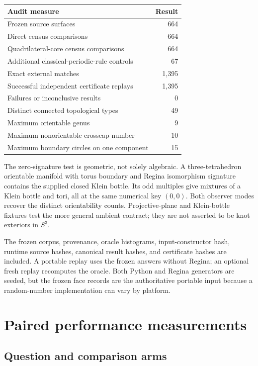 \begin{center}
\begin{tabular}{lr}
\toprule
Audit measure & Result\\
\midrule
Frozen source surfaces & 664\\
Direct census comparisons & 664\\
Quadrilateral-core census comparisons & 664\\
Additional classical-periodic-rule controls & 67\\
Exact external matches & 1,395\\
Successful independent certificate replays & 1,395\\
Failures or inconclusive results & 0\\
Distinct connected topological types & 49\\
Maximum orientable genus & 9\\
Maximum nonorientable crosscap number & 10\\
Maximum boundary circles on one component & 15\\
\bottomrule
\end{tabular}
\end{center}

The zero-signature test is geometric, not solely algebraic. A three-tetrahedron
orientable manifold with torus boundary and Regina isomorphism signature
 contains the supplied closed Klein bottle. Its odd
multiples give mixtures of a Klein bottle and tori, all at the same
numerical key $(0,0)$. Both observer modes recover the distinct
orientability counts. Projective-plane and Klein-bottle fixtures test
the more general ambient contract; they are not asserted to be knot
exteriors in $S^3$.

The frozen corpus, provenance, oracle histograms, input-constructor hash,
runtime source hashes, canonical result hashes, and certificate hashes
are included. A portable replay uses the frozen answers without Regina;
an optional fresh replay recomputes the oracle. Both Python and Regina
generators are seeded, but the frozen face records are the authoritative
portable input because a random-number implementation can vary by platform.

\section{Paired performance measurements}
\label{sec:benchmarks}

\subsection{Question and comparison arms}

